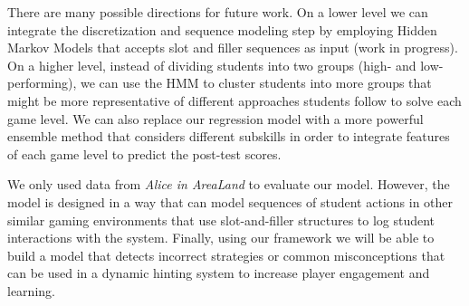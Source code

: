 \documentclass{sigchi}
\begin{document}
There are many possible directions for future work. On a lower level we can integrate the discretization and sequence modeling step by employing Hidden Markov Models that accepts slot and filler sequences as input (work in progress). On a higher level, instead of dividing students into two groups (high- and low-performing), we can use the HMM to cluster students \cite{bicego2003similarity,smyth1997clustering} into more groups that might be  more representative of different approaches students follow to solve each game level. We can also replace our regression model with a more powerful ensemble method that considers different subskills in order to integrate features of each game level to predict the post-test scores.

We only used data from \textit{Alice in AreaLand} to evaluate our model. However, the model is designed in a way that can model sequences of student actions in other similar gaming environments that use slot-and-filler structures to log student interactions with the system. Finally, using our framework we will be able to build a model that detects incorrect strategies or common misconceptions that can be used in a dynamic hinting system to increase player engagement and learning.


\balance

\end{document}
